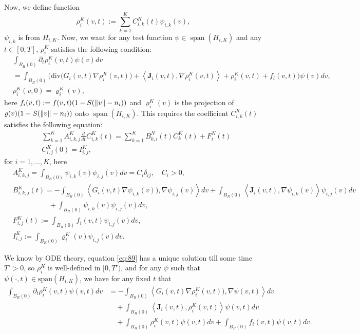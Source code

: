 \documentclass[a4paper, 11pt]{article}
\newcommand{\inner}[2]{\left< #1 , #2 \right>}
\theoremstyle{plain}
\theoremstyle{remark}
\theoremstyle{definition}
\renewcommand{\div}{\mathrm{div}}
\newcommand{\intr}{\int_{B_R(0)}}
\newcommand{\J}{\boldsymbol{J}}
\begin{document}
		Now, we define function
		\begin{equation}
			\rho_i^K(v,t):=\sum_{k=1}^{K}C^K_{i,k}(t)\psi_{i,k}(v),
		\end{equation}
		$\psi_{i,k}$ is from $H_{i,K}$. Now, we want for any test function $\psi\in \operatorname{span}(H_{i,K})$ and any $t\in [0,T]$, $\rho_i^K$ satisfies the following condition: 
		\begin{equation}\label{eq:gg55}
			\begin{aligned}
				&\intr \partial_t\rho_i^K(v,t)\psi(v)dv\\
				&=\intr \Big(\div\Big(G_i(v,t)\nabla\rho^K_i(v,t)\Big)+\inner{\J_i(v,t)}{\nabla\rho^K_i(v,t)}+\rho^K_i(v,t)+f_i(v,t)\Big)\psi(v)dv,\\
				&\rho_i^K(v,0)=\varrho^K_i(v),
			\end{aligned}
		\end{equation}
		here $f_i(v,t):=f(v,t)(1-S(\norm{v}-n_i))$ and $\varrho_i^K(v)$ is the projection of $\varrho(v)(1-S(\norm{v}-n_i))$ onto $\operatorname{span}(H_{i,K})$. This requires the coefficient $C^K_{i,k}(t)$ satisfies the following equation:
		\begin{equation}\label{eq:89}
			\begin{aligned}
				&\sum_{k=1}^{K} A^K_{i,k,j}\frac{d}{dt}C^K_{i,k}(t)= \sum_{k=1}^{K}B^N_{k,i}(t)C_k^K(t)+F^N_i(t)\\
				&C_{i,j}^K(0)=I^K_{i,j},
			\end{aligned}
		\end{equation}
		for $i=1,\ldots, K$, here
		\begin{align}
			&A^K_{i,k,j}=\intr \psi_{i,k}(v)\psi_{i,j}(v)dv=C_i\delta_{ij},\quad C_i>0,\\
			&B^K_{i,k,j}(t)=-\intr \inner{{G_i(v,t)}\nabla\psi_{i,k}(v))}{\nabla\psi_{i,j}(v)}dv+\intr \inner{\J_i(v,t)}{\nabla\psi_{i,k}(v)}\psi_{i,j}(v)dv\\
			&\qquad\qquad\quad+\intr \psi_{i,k}(v)\psi_{i,j}(v)dv,\\
			&F^K_{i,j}(t):=\intr f_i(v,t)\psi_{i,j}(v)dv,\\
			&I_{i,j}^K:=\intr \varrho^K_i(v)\psi_{i,j}(v)dv.
		\end{align}
		
		We know by ODE theory, equation \eqref{eq:89} has a unique solution till some time $T'>0$, so
		$\rho_i^K$ is well-defined in $[0,T')$, and for any $\psi$ such that $\psi(\cdot,t)\in \mathrm{span}(H_{i,K})$, we have for any fixed $t$ that
		\begin{equation}\label{eq:94}
			\begin{aligned}
				\intr \partial_t\rho_i^K(v,t) \psi(v,t)dv&=-\intr \inner{{G_i(v,t)}\nabla\rho_i^K(v,t))}{\nabla\psi(v,t)}dv\\
				&\quad+\intr \inner{\J_i(v,t)}{\rho_i^K(v,t)}\psi(v,t)dv\\
				&\quad +\intr\rho_i^K(v,t)\psi(v,t)dv+\intr f_i(v,t)\psi(v,t)dv.
			\end{aligned}
		\end{equation}
		
\end{document}
